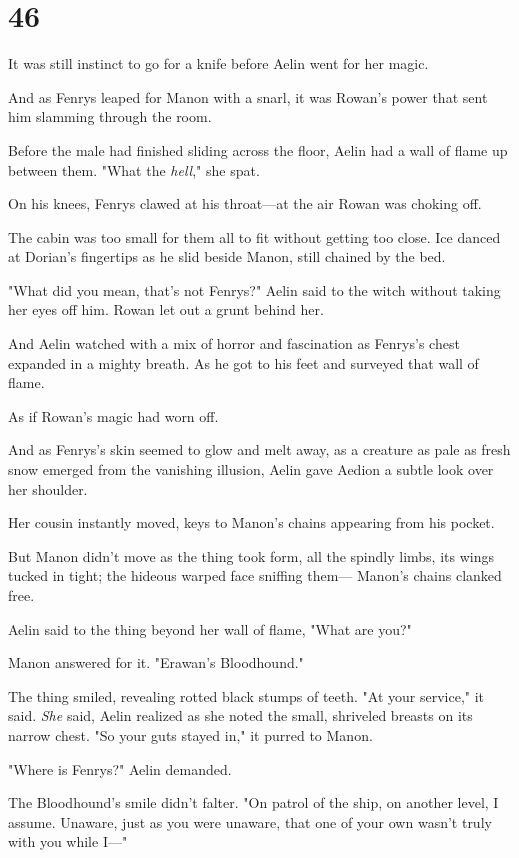 
\chapter{46}

It was still instinct to go for a knife before Aelin went for her magic.

And as Fenrys leaped for Manon with a snarl, it was Rowan's power that sent him slamming through the room.

Before the male had finished sliding across the floor, Aelin had a wall of flame up between them. "What the \emph{hell}," she spat.

On his knees, Fenrys clawed at his throat---at the air Rowan was choking off.

The cabin was too small for them all to fit without getting too close. Ice danced at Dorian's fingertips as he slid beside Manon, still chained by the bed.

"What did you mean, that's not Fenrys?" Aelin said to the witch without taking her eyes off him. Rowan let out a grunt behind her.

And Aelin watched with a mix of horror and fascination as Fenrys's chest expanded in a mighty breath. As he got to his feet and surveyed that wall of flame.

As if Rowan's magic had worn off.

And as Fenrys's skin seemed to glow and melt away, as a creature as pale as fresh snow emerged from the vanishing illusion, Aelin gave Aedion a subtle look over her shoulder.

Her cousin instantly moved, keys to Manon's chains appearing from his pocket.

But Manon didn't move as the thing took form, all the spindly limbs, its wings tucked in tight; the hideous warped face sniffing them--- Manon's chains clanked free.

Aelin said to the thing beyond her wall of flame, "What are you?"

Manon answered for it. "Erawan's Bloodhound."

The thing smiled, revealing rotted black stumps of teeth. "At your service," it said. \emph{She} said, Aelin realized as she noted the small, shriveled breasts on its narrow chest. "So your guts stayed in," it purred to Manon.

"Where is Fenrys?" Aelin demanded.

The Bloodhound's smile didn't falter. "On patrol of the ship, on another level, I assume. Unaware, just as you were unaware, that one of your own wasn't truly with you while I---"

